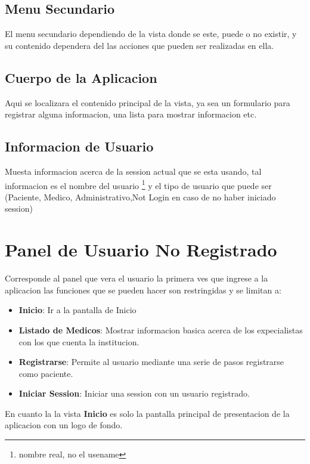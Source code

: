 \subsection{Menu Secundario}

El menu secundario dependiendo de la vista donde se este, puede o no existir, y
su contenido dependera del las acciones que pueden ser realizadas en ella.


\subsection{Cuerpo de la Aplicacion}

Aqui se localizara el contenido principal de la vista, ya sea un formulario para
registrar alguna informacion, una lista para mostrar informacion etc.


\subsection{Informacion de Usuario}

Muesta informacion acerca de la session actual que se esta usando, tal informacion
es el nombre del usuario \footnote{nombre real, no el usename} y el tipo de usuario
que puede ser (Paciente, Medico, Administrativo,Not Login en caso de no haber
iniciado session)


\section{Panel de Usuario No Registrado}

Corresponde al panel que vera el usuario la primera ves que ingrese a la aplicacion
las funciones que se pueden hacer son restringidas y se limitan a:

\begin{itemize}
    \item \textbf{Inicio}: Ir a la pantalla de Inicio
    \item \textbf{Listado de Medicos}: Mostrar informacion basica acerca de los expecialistas
        con los que cuenta la institucion.
    \item \textbf{Registrarse}: Permite al usuario mediante una serie de pasos registrarse como paciente.
    \item \textbf{Iniciar Session}: Iniciar una session con un usuario registrado.
\end{itemize}

En cuanto la la vista \textbf{Inicio} es solo la pantalla principal de presentacion
de la aplicacion con un logo de fondo.

